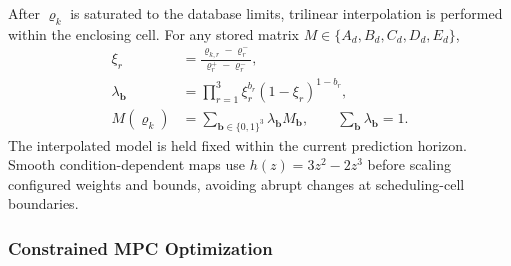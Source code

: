 \documentclass{ieeeaccess}
\begin{document}
After $\boldsymbol\varrho_k$ is saturated to the database limits, trilinear interpolation is performed within the enclosing cell. For any stored matrix $M\in\{A_d,B_d,C_d,D_d,E_d\}$,
\begin{equation}
\begin{aligned}
\xi_r&=\frac{\varrho_{k,r}-\varrho^-_r}{\varrho^+_r-\varrho^-_r},\\
\lambda_{\bm b}&=\prod_{r=1}^{3}\xi_r^{b_r}(1-\xi_r)^{1-b_r},\\
M(\boldsymbol\varrho_k)&=\sum_{\bm b\in\{0,1\}^3}
\lambda_{\bm b}M_{\bm b},
\qquad
\sum_{\bm b}\lambda_{\bm b}=1 .
\end{aligned}
\label{eq:trilinear_interp}
\end{equation}
The interpolated model is held fixed within the current prediction horizon. Smooth condition-dependent maps use $h(z)=3z^2-2z^3$ before scaling configured weights and bounds, avoiding abrupt changes at scheduling-cell boundaries.

\subsubsection{Constrained MPC Optimization}
\end{document}
